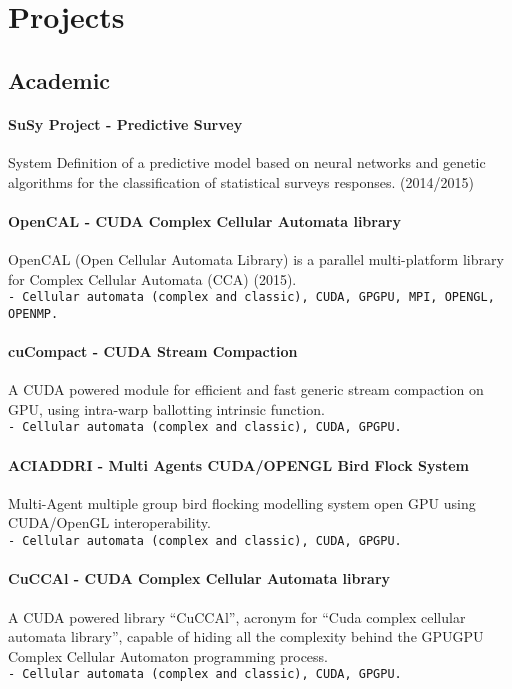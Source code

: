 \documentclass[a4paper,10pt]{article}
\begin{document}
\begin{center}
\mbox{}
\end{center}

\section{Projects}

\subsection{Academic}
 \paragraph{SuSy Project - Predictive Survey}
 System Definition of a predictive
 model based on neural networks and genetic algorithms for the classification of
 statistical surveys responses. (2014/2015)

\paragraph{OpenCAL - CUDA Complex Cellular Automata library} 
OpenCAL (Open Cellular Automata Library) is a parallel multi-platform library
for Complex Cellular Automata (CCA) (2015).
\hfill \\
\texttt{- \noindent Cellular automata (complex and classic), CUDA, GPGPU, MPI, OPENGL,
OPENMP.}
 
 \paragraph{cuCompact - CUDA Stream Compaction} 
A CUDA powered module for efficient and fast generic stream compaction on GPU,
using intra-warp ballotting intrinsic function. 
\hfill \\
\texttt{- 
\noindent Cellular automata (complex and classic), CUDA, GPGPU.}

 \paragraph{ACIADDRI - Multi Agents CUDA/OPENGL Bird Flock System} 
Multi-Agent multiple group bird flocking modelling system open GPU using
CUDA/OpenGL interoperability.
\hfill \\
\texttt{- 
\noindent Cellular automata (complex and classic), CUDA, GPGPU.}


\paragraph{CuCCAl - CUDA Complex Cellular Automata library} 
A CUDA powered library “CuCCAl”, acronym for “Cuda complex cellular
automata library”, capable of hiding all the complexity behind the GPUGPU
Complex Cellular Automaton programming process.
\hfill \\
\texttt{- 
\noindent Cellular automata (complex and classic), CUDA, GPGPU.}
\end{document}
